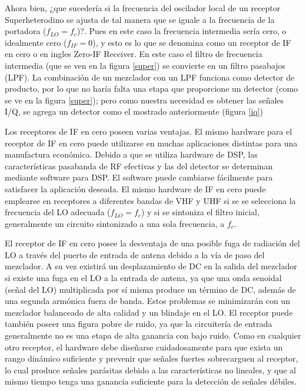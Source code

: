\documentclass[a4paper,12pt]{report} %
\begin{document}

Ahora bien, ¿que sucedería si la frecuencia del oscilador local de un receptor Superheterodino se ajusta de tal manera que se iguale a la frecuencia de la portadora ($f_{LO} = f_c$)?. Pues en este caso la frecuencia intermedia sería cero, o idealmente cero ($f_{IF} = 0$), y esto es lo que se denomina como un receptor de IF en cero o en ingles Zero-IF Receiver. En este caso el filtro de frecuencia intermedia (que se ven en la figura \ref{super}) se convierte en un filtro pasabajos (LPF). La combinación de un mezclador con un LPF funciona como detector de producto, por lo que no haría falta una etapa que proporcione un detector (como se ve en la figura \ref{super}); pero como nuestra necesidad es obtener las señales I/Q, se agrega un detector como el mostrado anteriormente (figura \ref{iq})

Los receptores de IF en cero poseen varias ventajas. El mismo hardware para el receptor de IF en cero puede utilizarse en muchas aplicaciones distintas para una manufactura económica. Debido a que se utiliza hardware de DSP, las características pasabanda de RF efectivas y las del detector se determinan mediante software para DSP. El software puede cambiarse fácilmente para satisfacer la aplicación deseada. El mismo hardware de IF en cero puede emplearse en receptores a diferentes bandas de VHF y UHF si se se selecciona la frecuencia del LO adecuada ($f_{LO} = f_c$) y si se sintoniza el filtro inicial, generalmente un circuito sintonizado a una sola frecuencia, a $f_c$.

El receptor de IF en cero posee la desventaja de una posible fuga de radiación del LO a través del puerto de entrada de antena debido a la vía de paso del mezclador. A su vez existirá un desplazamiento de DC en la salida del mezclador si existe una fuga en el LO a la entrada de antena, ya que una onda senoidal (señal del LO) multiplicada por sí misma produce un término de DC, además de una segunda armónica fuera de banda. Estos problemas se minimizarán con un mezclador balanceado de alta calidad y un blindaje en el LO. El receptor puede también poseer una figura pobre de ruido, ya que la circuitería de entrada generalmente no es una etapa de alta ganancia con bajo ruido. Como en cualquier otro receptor, el hardware debe diseñarse cuidadosamente para que exista un rango dinámico suficiente y prevenir que señales fuertes sobrecarguen al receptor, lo cual produce señales parásitas debido a las características no lineales, y que al mismo tiempo tenga una ganancia suficiente para la detección de señales débiles.
\end{document}
